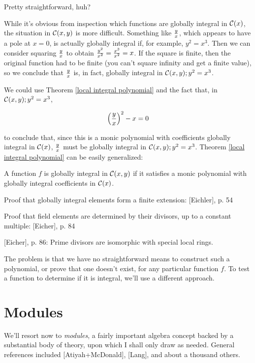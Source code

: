 \endtheorem

Pretty straightforward, huh?

While it's obvious from inspection which functions are globally
integral in ${\cal C}(x)$, the situation in ${\cal C}(x,y)$ is more
difficult.  Something like $y \over x$, which appears to have a pole
at $x=0$, is actually globally integral if, for example, $y^2=x^3$.
Then we can consider squaring $y \over x$ to obtain ${y^2 \over x^2} =
{x^3 \over x^2} = x$.  If the square is finite, then the original
function had to be finite (you can't square infinity and get a
finite value), so we conclude that $y \over x$ is, in fact,
globally integral in ${\cal C}(x,y); y^2=x^3$.

We could use Theorem \ref{local integral polynomial} and the fact
that, in ${\cal C}(x,y); y^2=x^3$,

	$$ \left({y \over x}\right)^2 - x = 0 $$

to conclude that, since this is a monic polynomial with coefficients
globally integral in ${\cal C}(x)$, $y \over x$ must be globally
integral in ${\cal C}(x,y); y^2=x^3$.  Theorem \ref{local integral
polynomial} can be easily generalized:

\theorem

A function $f$ is globally integral in ${\cal C}(x,y)$ if it
satisfies a monic polynomial with globally integral coefficients in
${\cal C}(x)$.

\proof

\endtheorem

Proof that globally integral elements form a finite extension:
[Eichler], p. 54

Proof that field elements are determined by their divisors, up to a
constant multiple: [Eicher], p. 84

[Eicher], p. 86: Prime divisors are isomorphic with special local rings.

The problem is that we have no straightforward means to construct
such a polynomial, or prove that one doesn't exist, for any
particular function $f$.  To test a function to determine
if it is integral, we'll use a different approach.

\section{Modules}

We'll resort now to {\it modules}, a fairly important algebra concept
backed by a substantial body of theory, upon which I shall only draw
as needed.  General references included [Atiyah+McDonald], [Lang], and
about a thousand others.

